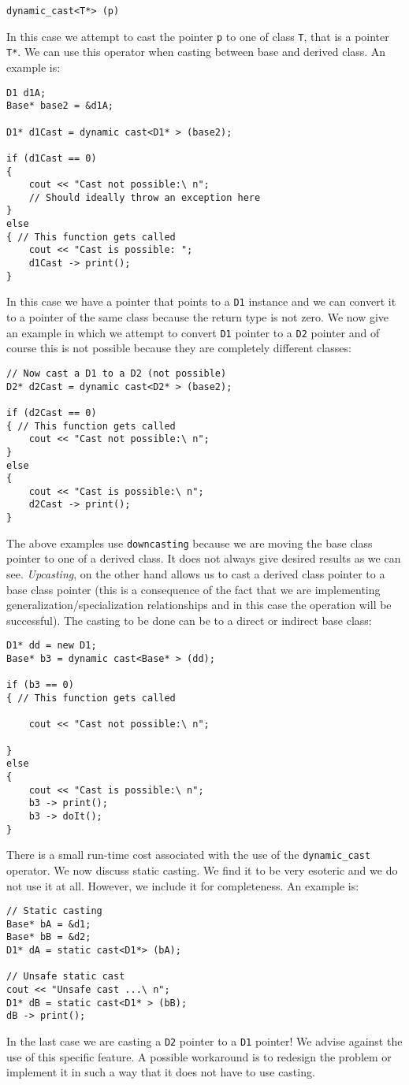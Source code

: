 \begin{lstlisting}
dynamic_cast<T*> (p)
\end{lstlisting}
In this case we attempt to cast the pointer \texttt{p} to one of class \texttt{T}, that is a pointer \texttt{T*}. We can use this operator when casting between base and derived class. An example is:
\begin{lstlisting}
D1 d1A;
Base* base2 = &d1A;

D1* d1Cast = dynamic cast<D1* > (base2);

if (d1Cast == 0)
{
	cout << "Cast not possible:\ n";
	// Should ideally throw an exception here
}
else
{ // This function gets called
	cout << "Cast is possible: ";
	d1Cast -> print();
}
\end{lstlisting}
In this case we have a pointer that points to a \texttt{D1} instance and we can convert it to a pointer of the same class because the return type is not zero. We now give an example in which we attempt to convert \texttt{D1} pointer to a \texttt{D2} pointer and of course this is not possible because they are completely different classes:
\begin{lstlisting}
// Now cast a D1 to a D2 (not possible)
D2* d2Cast = dynamic cast<D2* > (base2);

if (d2Cast == 0)
{ // This function gets called
	cout << "Cast not possible:\ n";
}
else
{
	cout << "Cast is possible:\ n";
	d2Cast -> print();
}
\end{lstlisting}
The above examples use \texttt{downcasting} because we are moving the base class pointer to one of a derived class. It does not always give desired results as we can see. \emph{Upcasting}, on the other hand allows us to cast a derived class pointer to a base class pointer (this is a consequence of the fact that we are implementing generalization/specialization relationships and in this case the operation will be successful). The casting to be done can be to a direct or indirect base class:

\begin{lstlisting}
D1* dd = new D1;
Base* b3 = dynamic cast<Base* > (dd);

if (b3 == 0)
{ // This function gets called

	cout << "Cast not possible:\ n";

}
else
{
	cout << "Cast is possible:\ n";
	b3 -> print();
	b3 -> doIt();
}
\end{lstlisting}
There is a small run-time cost associated with the use of the \texttt{dynamic\_cast} operator. We now discuss static casting. We find it to be very esoteric and we do not use it at all. However, we include it for completeness. An example is:
\begin{lstlisting}
// Static casting
Base* bA = &d1;
Base* bB = &d2;
D1* dA = static cast<D1*> (bA);

// Unsafe static cast
cout << "Unsafe cast ...\ n";
D1* dB = static cast<D1* > (bB);
dB -> print();
\end{lstlisting}
In the last case we are casting a \texttt{D2} pointer to a \texttt{D1} pointer! We advise against the use of this specific feature. A possible workaround is to redesign the problem or implement it in such a way that it does not have to use casting.

